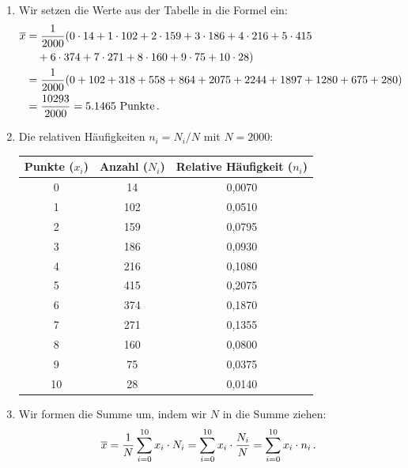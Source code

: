 \documentclass[ngerman]{scrreprt}
\newenvironment{loesungbox}[1]
  {\needspace{5\baselineskip}\begin{loesungboxstyle}[frametitle={#1}]}
  {\end{loesungboxstyle}}
\begin{document}
\begin{loesungbox}{Lösung zu \Cref{aufg:haeufigkeitsverteilung}}
\begin{enumerate}
    \item Wir setzen die Werte aus der Tabelle in die Formel ein:
    \begin{align}
        \overline{x} &= \frac{1}{2000} (0\cdot14 + 1\cdot102 + 2\cdot159 + 3\cdot186 + 4\cdot216 + 5\cdot415 \nonumber \\ 
        &\quad + 6\cdot374 + 7\cdot271 + 8\cdot160 + 9\cdot75 + 10\cdot28) \nonumber \\
        &= \frac{1}{2000} (0+102+318+558+864+2075+2244+1897+1280+675+280) \nonumber \\
        &= \frac{10293}{2000} = \num{5.1465} \text{ Punkte} \,.
    \end{align}
    
    \item Die relativen Häufigkeiten $n_i = N_i/N$ mit $N=2000$:
    \begin{center}
    \begin{tabular}{ccc}
    \toprule
    \textbf{Punkte ($x_i$)} & \textbf{Anzahl ($N_i$)} & \textbf{Relative Häufigkeit ($n_i$)} \\
    \midrule
    0 & 14 & 0,0070 \\
    1 & 102 & 0,0510 \\
    2 & 159 & 0,0795 \\
    3 & 186 & 0,0930 \\
    4 & 216 & 0,1080 \\
    5 & 415 & 0,2075 \\
    6 & 374 & 0,1870 \\
    7 & 271 & 0,1355 \\
    8 & 160 & 0,0800 \\
    9 & 75 & 0,0375 \\
    10 & 28 & 0,0140 \\
    \bottomrule
    \end{tabular}
    \end{center}

    \item Wir formen die Summe um, indem wir $N$ in die Summe ziehen:
    \begin{equation}
        \overline{x} = \frac{1}{N}\sum_{i=0}^{10}x_{i}\cdot N_{i} = \sum_{i=0}^{10}x_{i}\cdot \frac{N_{i}}{N} = \sum_{i=0}^{10}x_{i}\cdot n_{i} \,.
    \end{equation}
    

\end{enumerate}
\end{loesungbox}
\end{document}
